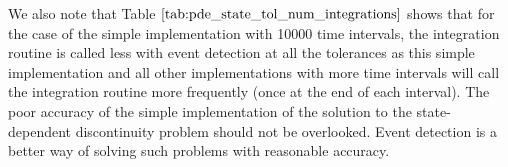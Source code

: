 \documentclass{article}
\begin{document}
We also note that Table $\ref{tab:pde_state_tol_num_integrations}$ shows that for the case of the simple implementation with 10000 time intervals, the integration routine is called less with event detection at all the tolerances as this simple implementation and all other implementations with more time intervals will call the integration routine more frequently (once at the end of each interval). The poor accuracy of the simple implementation of the solution to the state-dependent discontinuity problem should not be overlooked. Event detection is a better way of solving such problems with reasonable accuracy. 
\end{document}
